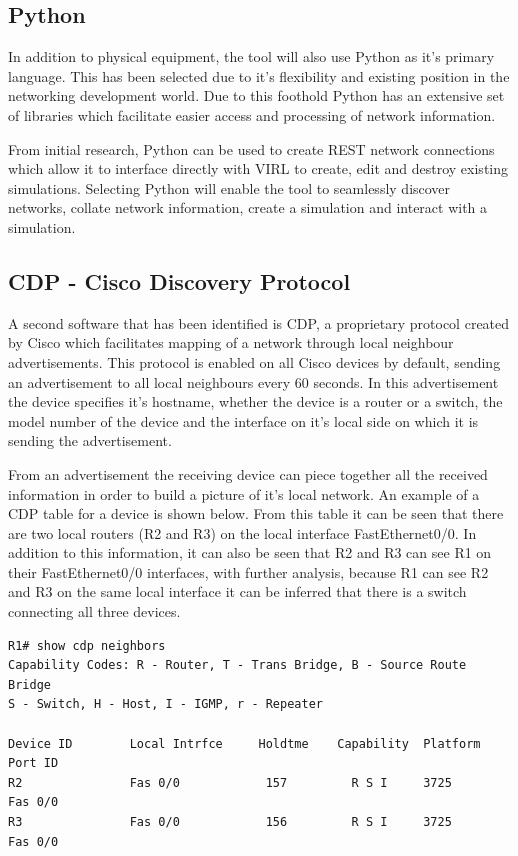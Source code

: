 \documentclass[11pt]{report}
\begin{document}
\subsection{Python}

In addition to physical equipment, the tool will also use Python as it's primary language. This has been selected due to it's flexibility and existing position in the networking development world. Due to this foothold Python has an extensive set of libraries which facilitate easier access and processing of network information.

From initial research, Python can be used to create REST network connections which allow it to interface directly with VIRL to create, edit and destroy existing simulations. Selecting Python will enable the tool to seamlessly discover networks, collate network information, create a simulation and interact with a simulation.

\subsection{CDP - Cisco Discovery Protocol}

A second software that has been identified is CDP, a proprietary protocol created by Cisco which facilitates mapping of a network through local neighbour advertisements. This protocol is enabled on all Cisco devices by default, sending an advertisement to all local neighbours every 60 seconds. In this advertisement the device specifies it's hostname, whether the device is a router or a switch, the model number of the device and the interface on it's local side on which it is sending the advertisement. 

From an advertisement the receiving device can piece together all the received information in order to build a picture of it's local network. An example of a CDP table for a device is shown below. From this table it can be seen that there are two local routers (R2 and R3) on the local interface FastEthernet0/0. In addition to this information, it can also be seen that R2 and R3 can see R1 on their FastEthernet0/0 interfaces, with further analysis, because R1 can see R2 and R3 on the same local interface it can be inferred that there is a switch connecting all three devices.

\begin{lstlisting}
R1# show cdp neighbors
Capability Codes: R - Router, T - Trans Bridge, B - Source Route Bridge
S - Switch, H - Host, I - IGMP, r - Repeater

Device ID        Local Intrfce     Holdtme    Capability  Platform  Port ID
R2               Fas 0/0            157         R S I     3725      Fas 0/0
R3               Fas 0/0            156         R S I     3725      Fas 0/0
\end{lstlisting}
\end{document}
